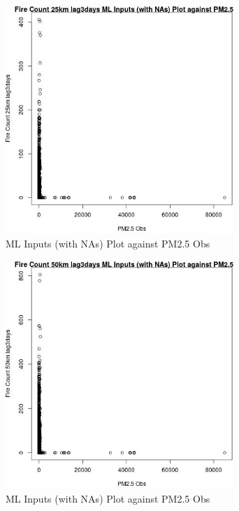 \begin{figure} 
\centering  
\includegraphics[width=0.77\textwidth]{Code_Outputs/Report_ML_input_PM25_Step4_part_f_de_duplicated_aveswNAs_Fire_Count_25km_lag3daysvPM25_Obs.jpg} 
\caption{\label{fig:Report_ML_input_PM25_Step4_part_f_de_duplicated_aveswNAsFire_Count_25km_lag3daysvPM25_Obs}ML Inputs (with NAs) Plot against PM2.5 Obs} 
\end{figure} 
 

\begin{figure} 
\centering  
\includegraphics[width=0.77\textwidth]{Code_Outputs/Report_ML_input_PM25_Step4_part_f_de_duplicated_aveswNAs_Fire_Count_50km_lag3daysvPM25_Obs.jpg} 
\caption{\label{fig:Report_ML_input_PM25_Step4_part_f_de_duplicated_aveswNAsFire_Count_50km_lag3daysvPM25_Obs}ML Inputs (with NAs) Plot against PM2.5 Obs} 
\end{figure} 
 

